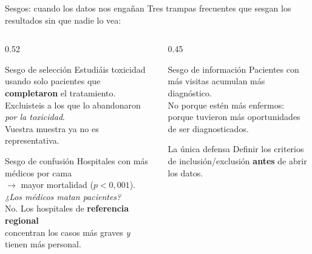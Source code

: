 \documentclass[aspectratio=169,10pt]{beamer}
\begin{document}
\begin{frame}{Sesgos: cuando los datos nos engañan}
  {\small\color{UCgray} Tres trampas frecuentes que sesgan los resultados sin que nadie lo vea:}
  \vspace{3mm}
  \begin{columns}[T]
    \begin{column}{0.52\textwidth}
      \begin{block}{Sesgo de selección}
        \small Estudiáis toxicidad usando solo pacientes
        que \textbf{completaron} el tratamiento.\\[2mm]
        Excluisteis a los que lo abandonaron
        \textit{por la toxicidad}.\\
        \scriptsize Vuestra muestra ya no es representativa.
      \end{block}
      \vspace{3mm}
      \begin{block}{Sesgo de confusión}
        \small Hospitales con más médicos por cama\\
        $\rightarrow$ mayor mortalidad ($p<0{,}001$).\\[2mm]
        \textit{¿Los médicos matan pacientes?}\\[1mm]
        \scriptsize No. Los hospitales de \textbf{referencia regional}\\
        concentran los casos más graves \textit{y} tienen más personal.
      \end{block}
    \end{column}
    \begin{column}{0.45\textwidth}
      \begin{block}{Sesgo de información}
        \small Pacientes con más visitas acumulan
        más diagnóstico.\\[2mm]
        \scriptsize No porque estén más enfermos: porque tuvieron más oportunidades de ser diagnosticados.
      \end{block}
      \vspace{3mm}
      \begin{exampleblock}{La única defensa}
        \scriptsize Definir los criterios de inclusión/exclusión \textbf{antes} de abrir los datos.
      \end{exampleblock}
    \end{column}
  \end{columns}
\end{frame}
\end{document}
